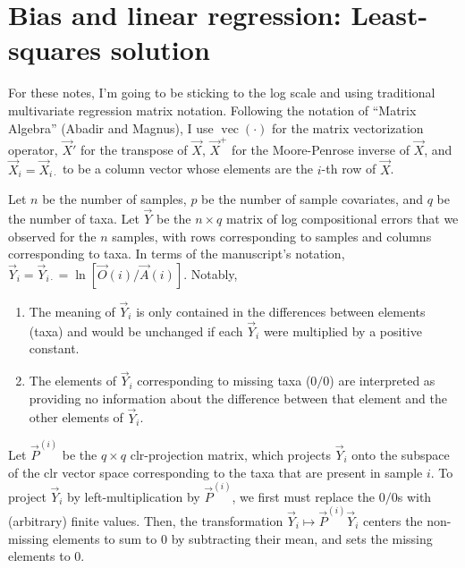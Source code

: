 

\DeclareMathOperator{\vecop}{vec}

\author{Michael McLaren, m.mclaren42@gmail.com}



\maketitle


\section{Bias and linear regression: Least-squares solution}

For these notes, I'm going to be sticking to the log scale and using
traditional multivariate regression matrix notation.  Following the notation of
``Matrix Algebra'' (Abadir and Magnus), I use $\vecop(\cdot)$ for the matrix
vectorization operator, $\vec X'$ for the transpose of $\vec X$, $\vec X^+$ for
the Moore-Penrose inverse of $\vec X$, and $\vec X_{i} = \vec X_{i\cdot}$ to be
a column vector whose elements are the $i$-th row of $\vec X$.

Let $n$ be the number of samples, $p$ be the number of sample covariates, and
$q$ be the number of taxa. 
Let $\vec Y$ be the $n \times q$ matrix of log compositional errors that we
observed for the $n$ samples, with rows corresponding to samples and columns
corresponding to taxa. In terms of the manuscript's notation, $\vec Y_{i} =
\vec Y_{i\cdot} = \ln [\vec O(i) / \vec A(i)]$.  Notably,
\begin{enumerate}
  \item The meaning of $\vec Y_{i}$ is only contained in the differences
    between elements (taxa) and would be unchanged if each $\vec Y_i$ were
    multiplied by a positive constant. 
  \item The elements of $\vec Y_i$ corresponding to missing taxa ($0/0$) are
    interpreted as providing no information about the difference between that
    element and the other elements of $\vec Y_i$.
\end{enumerate}
Let $\vec P^{(i)}$ be the $q\times q$ clr-projection matrix, which projects
$\vec Y_{i}$ onto the subspace of the clr vector space corresponding to the
taxa that are present in sample $i$. To project $\vec Y_{i}$ by
left-multiplication by $\vec P^{(i)}$, we first must replace the $0/0$s with
(arbitrary) finite values. Then, the transformation $\vec Y_{i}\mapsto \vec
P^{(i)}\vec Y_{i}$ centers the non-missing elements to sum to 0 by subtracting
their mean, and sets the missing elements to 0.

